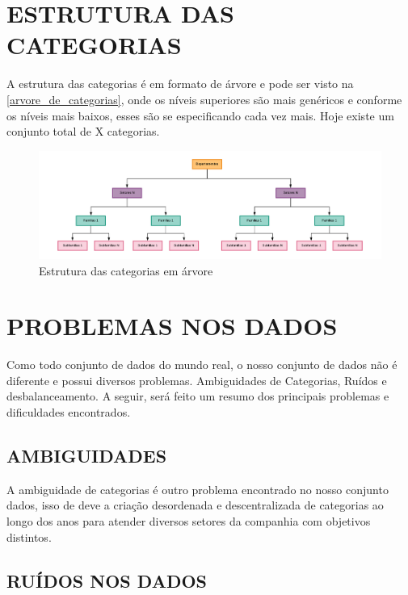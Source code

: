 \section{ESTRUTURA DAS CATEGORIAS}

A estrutura das categorias é em formato de árvore e pode ser visto na \autoref{arvore_de_categorias}, onde os níveis superiores são mais genéricos e conforme os níveis mais baixos, esses são se especificando cada vez mais. Hoje existe um conjunto total de X categorias.

\begin{figure}[htb]
	\caption{\label{arvore_de_categorias} Estrutura das categorias em árvore}
	\begin{center}
	    \includegraphics[scale=0.5]{artigo/recursos/imagens/arvore-de-categorias.png}
	\end{center}
\end{figure}


\section{PROBLEMAS NOS DADOS}

Como todo conjunto de dados do mundo real, o nosso conjunto de dados não é diferente e possui diversos problemas. Ambiguidades de Categorias, Ruídos e desbalanceamento. A seguir, será feito um resumo dos principais problemas e dificuldades encontrados.

\subsection{AMBIGUIDADES}

A ambiguidade de categorias é outro problema encontrado no nosso conjunto dados, isso de deve a criação desordenada e descentralizada de categorias ao longo dos anos para atender diversos setores da companhia com objetivos distintos. 

\subsection{RUÍDOS NOS DADOS}


